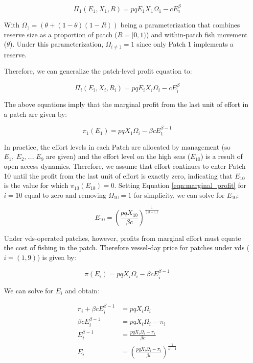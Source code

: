 \documentclass[12pt]{article}
\begin{document}
$$
\Pi_1(E_1,X_1,R) = pqE_1X_1\Omega_1-cE_1^\beta
$$

With $\Omega_1 = (\theta + (1 - \theta)(1 - R))$ being a parameterization that combines reserve size as a proportion of patch ($R =  [0, 1)$) and within-patch fish movement ($\theta$). Under this parameterization, $\Omega_{i \neq 1} = 1$ since only Patch 1 implements a reserve.

Therefore, we can generalize the patch-level profit equation to:

$$
\Pi_i(E_i,X_i, R_i) = pqE_iX_i\Omega_i-cE_i^\beta
$$

The above equations imply that the marginal profit from the last unit of effort in a patch are given by:

\begin{equation}
\pi_1(E_1) = pqX_1\Omega_i - \beta cE_1^{\beta-1}
\label{eqn:marginal_profit}
\end{equation}

In practice, the effort levels in each Patch are allocated by management (so $E_{1},\ E_{2},...,E_{9}$ are given) and the
effort level on the high seas ($E_{10}$) is a result of open access dynamics. Therefore, we assume that effort continues to enter Patch 10 until the profit from the last unit of effort is exactly zero, indicating that $E_{10}$ is the value for which $\pi_{10}(E_{10})  = 0$. Setting Equation \ref{eqn:marginal_profit} for $i = 10$ equal to zero and removing $\Omega_{10} = 1$ for simplicity, we can solve for $E_{10}$:

\begin{equation}
E_{10} = \left(\frac{pqX_{10}}{\beta c}\right)^{\frac{1}{(\beta - 1)}}
\label{eqn:effort_hs}
\end{equation}

Under vds-operated patches, however, profits from marginal effort must equate the cost of fishing in the patch. Therefore vessel-day price for patches under vds ($i = (1, 9)$) is  given by:

$$
\pi(E_i) = pqX_i\Omega_i - \beta c E_i ^{\beta - 1}
$$

We can solve for $E_i$ and obtain:

\begin{equation}
	\begin{split}
		\pi_i + \beta c E_i ^{\beta - 1} &= pqX_i\Omega_i \\
		\beta c E_i ^{\beta - 1} &= pqX_i\Omega_i - \pi_i \\
		E_i ^{\beta - 1} &= \frac{pqX_i\Omega_i - \pi_i}{\beta c} \\
		E_i &= \left(\frac{pqX_i\Omega_i - \pi_i}{\beta c }\right) ^ {\frac{1}{\beta - 1}}
	\end{split}
\label{eqn:demands}
\end{equation}
\end{document}
